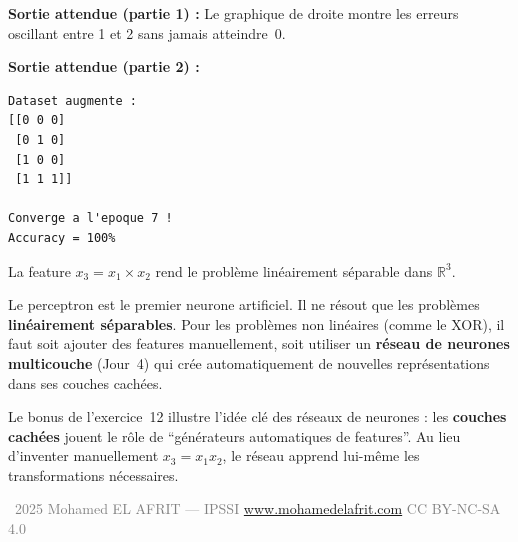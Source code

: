 \textbf{Sortie attendue (partie 1) :}
Le graphique de droite montre les erreurs oscillant entre 1 et 2 sans jamais atteindre~0.

\textbf{Sortie attendue (partie 2) :}
\begin{verbatim}
Dataset augmente :
[[0 0 0]
 [0 1 0]
 [1 0 0]
 [1 1 1]]

Converge a l'epoque 7 !
Accuracy = 100%
\end{verbatim}

La feature $x_3 = x_1 \times x_2$ rend le probl\`{e}me lin\'{e}airement s\'{e}parable dans $\mathbb{R}^3$.

\begin{retenirbox}
    Le perceptron est le premier neurone artificiel. Il ne r\'{e}sout que les probl\`{e}mes
    \textbf{lin\'{e}airement s\'{e}parables}. Pour les probl\`{e}mes non lin\'{e}aires (comme le XOR),
    il faut soit ajouter des features manuellement, soit utiliser un
    \textbf{r\'{e}seau de neurones multicouche} (Jour~4) qui cr\'{e}e automatiquement
    de nouvelles repr\'{e}sentations dans ses couches cach\'{e}es.
\end{retenirbox}

\begin{intuitionbox}
    Le bonus de l'exercice~12 illustre l'id\'{e}e cl\'{e} des r\'{e}seaux de neurones :
    les \textbf{couches cach\'{e}es} jouent le r\^{o}le de ``g\'{e}n\'{e}rateurs automatiques de features''.
    Au lieu d'inventer manuellement $x_3 = x_1 x_2$, le r\'{e}seau apprend
    lui-m\^{e}me les transformations n\'{e}cessaires.
\end{intuitionbox}

\vfill
\begin{center}
    {\footnotesize\sffamily\textcolor{gray}{%
        \textcopyright\ 2025 Mohamed EL AFRIT --- IPSSI \enspace\textbullet\enspace
        \url{www.mohamedelafrit.com} \enspace\textbullet\enspace
        CC BY-NC-SA 4.0
    }}
\end{center}


